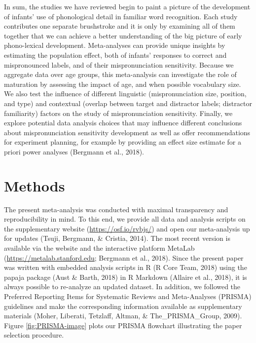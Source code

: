\documentclass[
  english,
  man, noextraspace]{apa6}
\begin{document}
In sum, the studies we have reviewed begin to paint a picture of the development of infants' use of phonological detail in familiar word recognition. Each study contributes one separate brushstroke and it is only by examining all of them together that we can achieve a better understanding of the big picture of early phono-lexical development. Meta-analyses can provide unique insights by estimating the population effect, both of infants' responses to correct and mispronounced labels, and of their mispronunciation sensitivity. Because we aggregate data over age groups, this meta-analysis can investigate the role of maturation by assessing the impact of age, and when possible vocabulary size. We also test the influence of different linguistic (mispronunciation size, position, and type) and contextual (overlap between target and distractor labels; distractor familiarity) factors on the study of mispronunciation sensitivity. Finally, we explore potential data analysis choices that may influence different conclusions about mispronunciation sensitivity development as well as offer recommendations for experiment planning, for example by providing an effect size estimate for a priori power analyses (Bergmann et al., 2018).

\hypertarget{methods}{%
\section{Methods}\label{methods}}

The present meta-analysis was conducted with maximal transparency and reproducibility in mind. To this end, we provide all data and analysis scripts on the supplementary website (\url{https://osf.io/rvbjs/}) and open our meta-analysis up for updates (Tsuji, Bergmann, \& Cristia, 2014). The most recent version is available via the website and the interactive platform MetaLab (\url{https://metalab.stanford.edu}; Bergmann et al., 2018). Since the present paper was written with embedded analysis scripts in R (R Core Team, 2018) using the papaja package (Aust \& Barth, 2018) in R Markdown (Allaire et al., 2018), it is always possible to re-analyze an updated dataset. In addition, we followed the Preferred Reporting Items for Systematic Reviews and Meta-Analyses (PRISMA) guidelines and make the corresponding information available as supplementary materials (Moher, Liberati, Tetzlaff, Altman, \& The\_PRISMA\_Group, 2009). Figure \ref{fig:PRISMA-image} plots our PRISMA flowchart illustrating the paper selection procedure.
\end{document}
